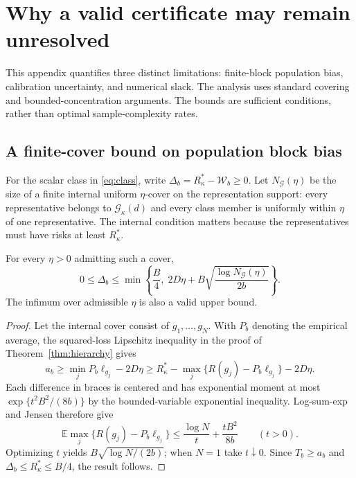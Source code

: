 
\section{Why a valid certificate may remain unresolved}
\label{app:resolution}

This appendix quantifies three distinct limitations: finite-block population
bias, calibration uncertainty, and numerical slack. The analysis uses standard covering and
bounded-concentration arguments. The bounds are sufficient conditions,
rather than optimal sample-complexity rates.

\subsection{A finite-cover bound on population block bias}

For the scalar class in \eqref{eq:class}, write
$\Delta_b=R^*_\kappa-\mathcal W_b\geq0$. Let
$N_{\mathcal G}(\eta)$ be the size of a finite internal uniform
$\eta$-cover on the representation support: every representative belongs
to $\mathcal G_\kappa(d)$ and every class member is uniformly within
$\eta$ of one representative. The internal condition matters because the
representatives must have risks at least $R^*_\kappa$.

\begin{proposition}
\label{prop:cover}
For every $\eta>0$ admitting such a cover,
\begin{equation}
 0\leq\Delta_b\leq
 \min\left\{\frac B4,\;
  2D\eta+B\sqrt{\frac{\log N_{\mathcal G}(\eta)}{2b}}\right\}.
 \label{eq:cover}
\end{equation}
The infimum over admissible $\eta$ is also a valid upper bound.
\end{proposition}

\begin{proof}
Let the internal cover consist of $g_1,\ldots,g_N$. With $P_b$ denoting
the empirical average, the squared-loss Lipschitz inequality in the proof
of Theorem~\ref{thm:hierarchy} gives
\[
 a_b\geq\min_j P_b\ell_{g_j}-2D\eta
 \geq R^*_\kappa-\max_j\{R(g_j)-P_b\ell_{g_j}\}-2D\eta.
\]
Each difference in braces is centered and has exponential moment at most
$\exp\{t^2 B^2/(8b)\}$ by the bounded-variable exponential inequality.
Log-sum-exp and Jensen therefore give
\[
 \mathbb E\max_j\{R(g_j)-P_b\ell_{g_j}\}
 \leq\frac{\log N}{t}+\frac{tB^2}{8b}\qquad(t>0).
\]
Optimizing $t$ yields $B\sqrt{\log N/(2b)}$; when $N=1$ take
$t\downarrow0$. Since $T_b\geq a_b$ and
$\Delta_b\leq R^*_\kappa\leq B/4$, the result follows.
\end{proof}

